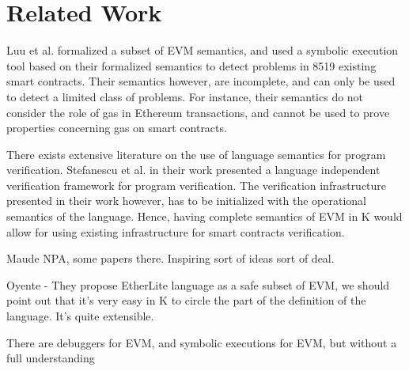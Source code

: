 \section{Related Work} Luu et al.\cite{luumaking} formalized a subset of EVM
semantics, and used a symbolic execution tool based on their formalized
semantics to detect problems in 8519 existing smart contracts. Their semantics
however, are incomplete, and can only be used to detect a limited class of
problems. For instance, their semantics do not consider the role of gas in
Ethereum transactions, and cannot be used to prove properties concerning gas on
smart contracts.

There exists extensive literature on the use of language semantics for program
verification. Stefanescu et al.
\cite{stefanescu-park-yuwen-li-rosu-2016-oopsla} in their work presented a
language independent verification framework for program verification. The
verification infrastructure presented in their work however, has to be
initialized with the operational semantics of the language. Hence, having
complete semantics of EVM in K would allow for using existing infrastructure
for smart contracts verification.

Maude NPA, some papers there. Inspiring sort of ideas sort of deal.

Oyente - They propose EtherLite language as a safe subset of EVM, we should
point out that it's very easy in K to circle the part of the definition of the
language. It's quite extensible.

There are debuggers for EVM, and symbolic executions for EVM, but without a full
understanding
